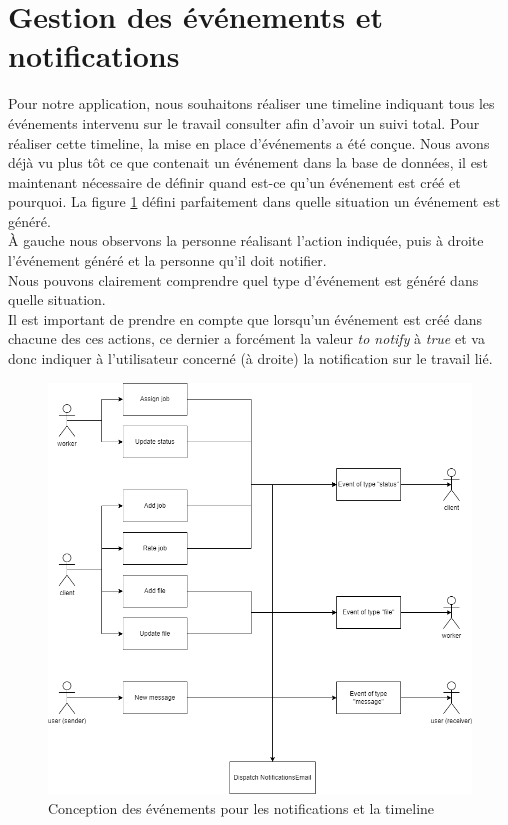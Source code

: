 \documentclass[
    iai, %
    il, %
]{heig-tb}
\begin{document}
\section{Gestion des événements et notifications}
Pour notre application, nous souhaitons réaliser une timeline indiquant tous les événements intervenu sur le travail consulter afin d'avoir un suivi total. Pour réaliser cette timeline, la mise en place d'événements a été conçue. Nous avons déjà vu plus tôt ce que contenait un événement dans la base de données, il est maintenant nécessaire de définir quand est-ce qu'un événement est créé et pourquoi. La figure \ref{events-email-scenario.drawio} défini parfaitement dans quelle situation un événement est généré. \\
À gauche nous observons la personne réalisant l'action indiquée, puis à droite l'événement généré et la personne qu'il doit notifier. \\
Nous pouvons clairement comprendre quel type d'événement est généré dans quelle situation. \\
Il est important de prendre en compte que lorsqu'un événement est créé dans chacune des ces actions, ce dernier a forcément la valeur \emph{to notify} à \emph{true} et va donc indiquer à l'utilisateur concerné (à droite) la notification sur le travail lié.

\begin{center}
    \begin{figure}[H]
        \includegraphics[width=\textwidth]{./assets/figures/events-email-scenario.drawio.png}
        \caption{Conception des événements pour les notifications et la timeline \label{events-email-scenario.drawio}}
    \end{figure}
\end{center}
\end{document}
